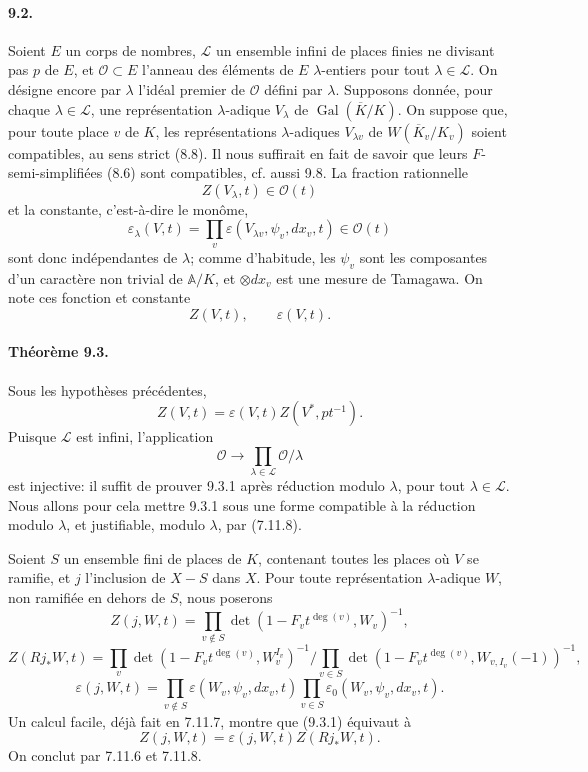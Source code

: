 \documentclass[10pt]{article}
\newcommand{\Gal}{\operatorname{Gal}}
\providecommand{\Gal}{\operatorname{Gal}}
\providecommand{\LLL}{\mathcal L}
\providecommand{\Gal}{\operatorname{Gal}}
\providecommand{\Gal}{\operatorname{Gal}}
\providecommand{\Gal}{\operatorname{Gal}}
\begin{document}
\paragraph{9.2.} Soient $E$ un corps de nombres, $\LLL$ un ensemble infini de places finies ne divisant pas $p$ de $E$, et $\mathcal O\subset E$ l'anneau des éléments de $E$ $\lambda$-entiers pour tout $\lambda\in\LLL$. On désigne encore par $\lambda$ l'idéal premier de $\mathcal O$ défini par $\lambda$. Supposons donnée, pour chaque $\lambda\in\LLL$, une représentation $\lambda$-adique $V_\lambda$ de $\Gal(\overline K/K)$. On suppose que, pour toute place $v$ de $K$, les représentations $\lambda$-adiques $V_{\lambda v}$ de $W(\overline K_v/K_v)$ soient compatibles, au sens strict (8.8). Il nous suffirait en fait de savoir que leurs $F$-semi-simplifiées (8.6) sont compatibles, cf. aussi 9.8. La fraction rationnelle
\[
Z(V_\lambda,t)\in\mathcal O(t)
\]
et la constante, c'est-à-dire le monôme,
\[
\varepsilon_\lambda(V,t)=\prod_v\varepsilon(V_{\lambda v},\psi_v,dx_v,t)\in\mathcal O(t)
\]
sont donc indépendantes de $\lambda$; comme d'habitude, les $\psi_v$ sont les composantes d'un caractère non trivial de $\mathbb A/K$, et $\otimes dx_v$ est une mesure de Tamagawa. On note ces fonction et constante
\[
Z(V,t),\qquad \varepsilon(V,t).
\]

\paragraph{Théorème 9.3.} Sous les hypothèses précédentes,
\[
\tag{9.3.1}
Z(V,t)=\varepsilon(V,t)Z(V^*,pt^{-1}).
\]
Puisque $\LLL$ est infini, l'application
\[
\mathcal O\longrightarrow\prod_{\lambda\in\LLL}\mathcal O/\lambda
\]
est injective: il suffit de prouver 9.3.1 après réduction modulo $\lambda$, pour tout $\lambda\in\LLL$. Nous allons pour cela mettre 9.3.1 sous une forme compatible à la réduction modulo $\lambda$, et justifiable, modulo $\lambda$, par (7.11.8).

Soient $S$ un ensemble fini de places de $K$, contenant toutes les places où $V$ se ramifie, et $j$ l'inclusion de $X-S$ dans $X$. Pour toute représentation $\lambda$-adique $W$, non ramifiée en dehors de $S$, nous poserons
\[
Z(j,W,t)=\prod_{v\notin S}\det(1-F_vt^{\deg(v)},W_v)^{-1},
\]
\[
Z(Rj_*W,t)=
\prod_v\det(1-F_vt^{\deg(v)},W_v^{I_v})^{-1}
\Big/
\prod_{v\in S}\det(1-F_vt^{\deg(v)},W_{v,I_v}(-1))^{-1},
\]
\[
\varepsilon(j,W,t)=
\prod_{v\notin S}\varepsilon(W_v,\psi_v,dx_v,t)
\prod_{v\in S}\varepsilon_0(W_v,
\psi_v,dx_v,t).
\]
Un calcul facile, déjà fait en 7.11.7, montre que (9.3.1) équivaut à
\[
\tag{9.3.2}
Z(j,W,t)=\varepsilon(j,W,t)Z(Rj_*W,t).
\]
On conclut par 7.11.6 et 7.11.8.
\end{document}
